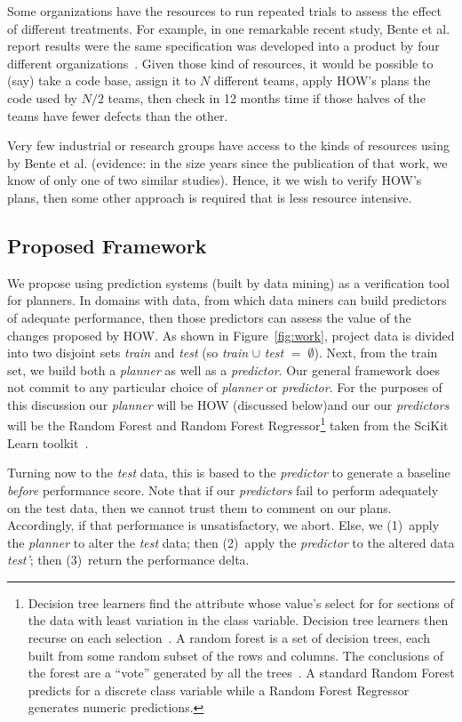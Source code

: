 \documentclass[conference]{IEEEtran}
\newcommand{\fig}[1]{Figure~\ref{fig:#1}}
\begin{document}
Some organizations have the resources to 
run repeated trials to assess the effect of different treatments.
For example, in one remarkable recent study, Bente et al. report results
were the same specification was developed into a product by four different organizations~\cite{Anda2009}. Given those kind of resources, it would be possible
to (say) take a code base, assign it to $N$ different teams, apply
HOW's plans the code used by  $N/2$ teams, then check in 12 months time
if those halves of the teams have fewer defects than the other.  

Very few industrial or research groups have access
to the kinds of resources using by Bente et al. (evidence: in the size years since the
publication of that work, we know of only one of two similar studies). Hence, it
we wish to verify HOW's plans, then some other approach is required that is less
resource intensive.

\subsection{Proposed Framework}

We propose using prediction systems (built by data mining) as a verification
tool for planners. In domains with data, from which data miners can build
predictors of adequate performance, then those predictors can assess the value
of the changes proposed by HOW.
As shown in \fig{work}, 
project data is divided into two disjoint sets {\em train} and {\em test}
(so {\em train} $\cup$ {\em test} $=\;\emptyset$).
Next, from the train set, we build both a {\em planner} as well
as a {\em predictor}. Our general framework does not   commit to any particular  choice
of {\em planner} or {\em predictor}. For the purposes of this discussion 
our {\em planner}
will be HOW (discussed below)and our
our {\em predictors} will be the Random Forest and Random Forest
Regressor\footnote{Decision tree learners find the attribute whose value's
select for for sections of the data with least variation in the class
variable. Decision tree learners then recurse on each selection~\cite{breiman84}. A random forest is a set of decision trees, each built
from some random subset of the rows and columns. The conclusions
of the forest are a ``vote'' generated by all the trees~\cite{Breiman2001}. 
A standard Random Forest predicts for a discrete class variable while
a Random Forest Regressor generates numeric predictions.} taken from the SciKit
Learn toolkit~\cite{Pedregosa2012}.

Turning now to the {\em test} data, this is based to the {\em predictor}
to generate a baseline {\em before} performance score.
Note that if our {\em predictors} fail to perform adequately on the test data,
then we cannot trust them to comment on our plans. Accordingly,
if that performance is unsatisfactory, we abort.
Else, we (1)~apply the {\em planner} to alter the {\em test} data;
then (2)~apply the {\em predictor} to the altered data {\em test'};
then (3)~return the performance delta.
\end{document}
